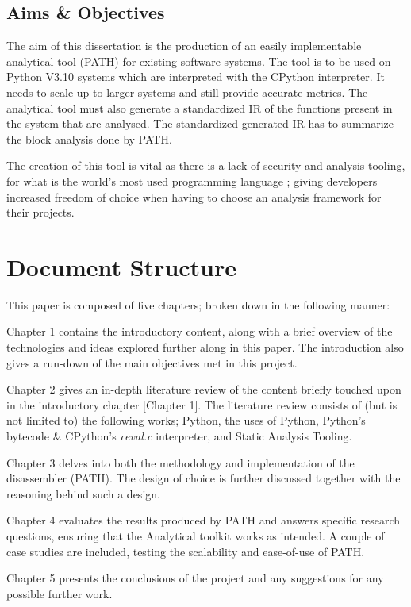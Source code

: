         \subsection{Aims \& Objectives}
        \par The aim of this dissertation is the production of an easily implementable analytical tool (\acs{PATH}) for existing software systems.
        The tool is to be used on Python V3.10 \cite{van2021python} systems which are interpreted with the CPython \cite{van2021python} interpreter. It needs 
        to scale up to larger systems and still provide accurate metrics. The analytical tool must also generate a standardized IR of the functions 
        present in the system that are analysed. The standardized generated IR has to summarize the block analysis done by \acs{PATH}. 
        \par The creation of this tool is vital as there is a lack of security and analysis tooling, for what is the world's most used programming language 
        \cite{tiobe2022index}; giving developers increased freedom of choice when having to choose an analysis framework for their projects.
        


    \section{Document Structure}
    This paper is composed of five chapters; broken down in the following manner:
    \par  \par Chapter 1 contains the introductory content, along with a brief overview of the technologies and ideas explored further
    along in this paper. The introduction also gives a run-down of the main objectives met in this project.
    \par Chapter 2 gives an in-depth literature review of the content briefly touched upon in the introductory chapter [Chapter 1]. The literature review
    consists of (but is not limited to) the following works; Python, the uses of Python, Python's bytecode \& CPython's \textit{ceval.c} interpreter, and Static Analysis Tooling.  
    \par Chapter 3 delves into both the methodology and implementation of the disassembler (\acs{PATH}). The design of choice is further discussed together with the reasoning behind such a design.
    \par Chapter 4 evaluates the results produced by \acs{PATH} and answers specific research questions, ensuring that the Analytical toolkit works as intended. A couple of case studies are included,
    testing the scalability and ease-of-use of \acs{PATH}.
    \par Chapter 5 presents the conclusions of the project and any suggestions for any possible further work.

